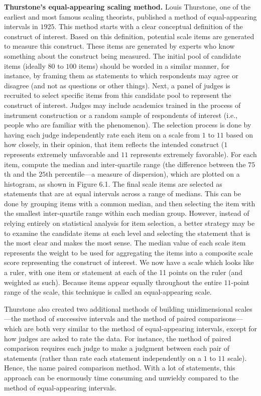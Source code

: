 \textbf{Thurstone's equal-appearing scaling method.} Louis Thurstone, one of the earliest and most famous scaling theorists, published a method of equal-appearing intervals in $ 1925 $. This method starts with a clear conceptual definition of the construct of interest. Based on this definition, potential scale items are generated to measure this construct. These items are generated by experts who know something about the construct being measured. The initial pool of candidate items (ideally $ 80 $ to $ 100 $ items) should be worded in a similar manner, for instance, by framing them as statements to which respondents may agree or disagree (and not as questions or other things). Next, a panel of judges is recruited to select specific items from this candidate pool to represent the construct of interest. Judges may include academics trained in the process of instrument construction or a random sample of respondents of interest (i.e., people who are familiar with the phenomenon). The selection process is done by having each judge independently rate each item on a scale from $ 1 $ to $ 11 $ based on how closely, in their opinion, that item reflects the intended construct ($ 1 $ represents extremely unfavorable and $ 11 $ represents extremely favorable). For each item, compute the median and inter-quartile range (the difference between the $ 75 $th and the $ 25 $th percentile---a measure of dispersion), which are plotted on a histogram, as shown in Figure 6.1. The final scale items are selected as statements that are at equal intervals across a range of medians. This can be done by grouping items with a common median, and then selecting the item with the smallest inter-quartile range within each median group. However, instead of relying entirely on statistical analysis for item selection, a better strategy may be to examine the candidate items at each level and selecting the statement that is the most clear and makes the most sense. The median value of each scale item represents the weight to be used for aggregating the items into a composite scale score representing the construct of interest. We now have a scale which looks like a ruler, with one item or statement at each of the 11 points on the ruler (and weighted as such). Because items appear equally throughout the entire $ 11 $-point range of the scale, this technique is called an equal-appearing scale.

Thurstone also created two additional methods of building unidimensional scales---the method of successive intervals and the method of paired comparisons---which are both very similar to the method of equal-appearing intervals, except for how judges are asked to rate the data. For instance, the method of paired comparison requires each judge to make a judgment between each pair of statements (rather than rate each statement independently on a $ 1 $ to $ 11 $ scale). Hence, the name paired comparison method. With a lot of statements, this approach can be enormously time consuming and unwieldy compared to the method of equal-appearing intervals.

